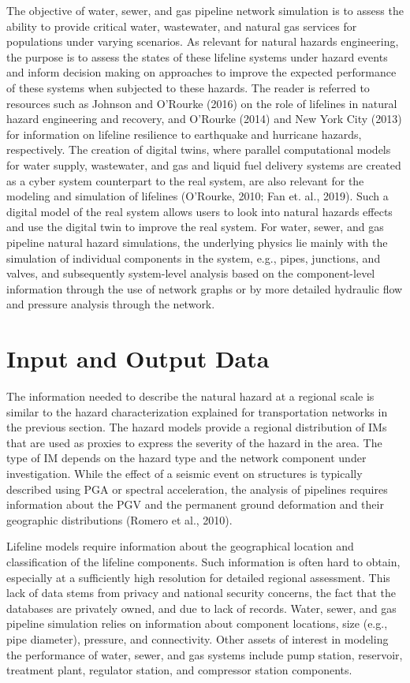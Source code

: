The objective of water, sewer, and gas pipeline network simulation is to assess the ability to provide critical water, wastewater, and natural gas services for populations under varying scenarios. As relevant for natural hazards engineering, the purpose is to assess the states of these lifeline systems under hazard events and inform decision making on approaches to improve the expected performance of these systems when subjected to these hazards. The reader is referred to resources such as Johnson and O’Rourke (2016) on the role of lifelines in natural hazard engineering and recovery, and O’Rourke (2014) and New York City (2013) for information on lifeline resilience to earthquake and hurricane hazards, respectively. The creation of digital twins, where parallel computational models for water supply, wastewater, and gas and liquid fuel delivery systems are created as a cyber system counterpart to the real system, are also relevant for the modeling and simulation of lifelines (O’Rourke, 2010; Fan et. al., 2019). Such a digital model of the real system allows users to look into natural hazards effects and use the digital twin to improve the real system. For water, sewer, and gas pipeline natural hazard simulations, the underlying physics lie mainly with the simulation of individual components in the system, e.g., pipes, junctions, and valves, and subsequently system-level analysis based on the component-level information through the use of network graphs or by more detailed hydraulic flow and pressure analysis through the network.
 
\section{Input and Output Data}
\label{sec:perf_pipeline_io}

The information needed to describe the natural hazard at a regional scale is similar to the hazard characterization explained for transportation networks in the previous section. The hazard models provide a regional distribution of IMs that are used as proxies to express the severity of the hazard in the area. The type of IM depends on the hazard type and the network component under investigation. While the effect of a seismic event on structures is typically described using PGA or spectral acceleration, the analysis of pipelines requires information about the PGV and the permanent ground deformation and their geographic distributions (Romero et al., 2010).

Lifeline models require information about the geographical location and classification of the lifeline components. Such information is often hard to obtain, especially at a sufficiently high resolution for detailed regional assessment. This lack of data stems from privacy and national security concerns, the fact that the databases are privately owned, and due to lack of records. Water, sewer, and gas pipeline simulation relies on information about component locations, size (e.g., pipe diameter), pressure, and connectivity. Other assets of interest in modeling the performance of water, sewer, and gas systems include pump station, reservoir, treatment plant, regulator station, and compressor station components.

